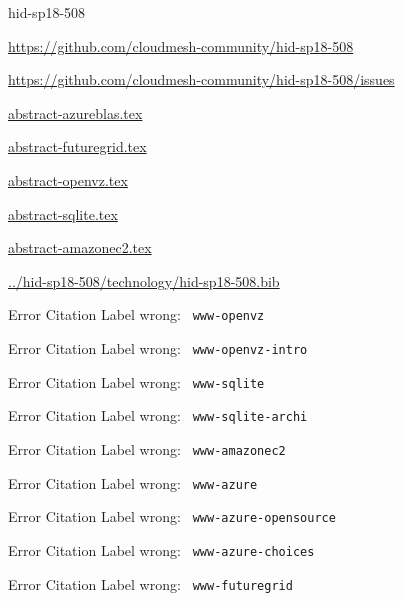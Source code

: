 \begin{IU}

hid-sp18-508

\url{https://github.com/cloudmesh-community/hid-sp18-508}

\url{https://github.com/cloudmesh-community/hid-sp18-508/issues}

\href{https://github.com/cloudmesh-community/hid-sp18-508/blob/master//technology/abstract-azureblas.tex}{abstract-azureblas.tex}

\href{https://github.com/cloudmesh-community/hid-sp18-508/blob/master//technology/abstract-futuregrid.tex}{abstract-futuregrid.tex}

\href{https://github.com/cloudmesh-community/hid-sp18-508/blob/master//technology/abstract-openvz.tex}{abstract-openvz.tex}

\href{https://github.com/cloudmesh-community/hid-sp18-508/blob/master//technology/abstract-sqlite.tex}{abstract-sqlite.tex}

\href{https://github.com/cloudmesh-community/hid-sp18-508/blob/master//technology/abstract-amazonec2.tex}{abstract-amazonec2.tex}

\href{https://github.com/cloudmesh-community/hid-sp18-508/blob/master//technology/hid-sp18-508.bib}{../hid-sp18-508/technology/hid-sp18-508.bib}

 Error Citation Label wrong: \verb| www-openvz |

 Error Citation Label wrong: \verb| www-openvz-intro |

 Error Citation Label wrong: \verb| www-sqlite |

 Error Citation Label wrong: \verb| www-sqlite-archi |

 Error Citation Label wrong: \verb| www-amazonec2 |

 Error Citation Label wrong: \verb| www-azure |

 Error Citation Label wrong: \verb| www-azure-opensource |

 Error Citation Label wrong: \verb| www-azure-choices |

 Error Citation Label wrong: \verb| www-futuregrid |

\end{IU}


